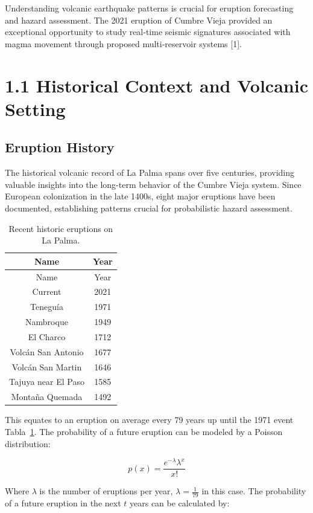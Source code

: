 \documentclass[
  spanish,
  letterpaper,
]{book}
\begin{document}
Understanding volcanic earthquake patterns is crucial for eruption
forecasting and hazard assessment. The 2021 eruption of Cumbre Vieja
provided an exceptional opportunity to study real-time seismic
signatures associated with magma movement through proposed
multi-reservoir systems {[}1{]}.

\section{1.1 Historical Context and Volcanic
Setting}\label{historical-context-and-volcanic-setting}

\subsection{Eruption History}\label{eruption-history}

The historical volcanic record of La Palma spans over five centuries,
providing valuable insights into the long-term behavior of the Cumbre
Vieja system. Since European colonization in the late 1400s, eight major
eruptions have been documented, establishing patterns crucial for
probabilistic hazard assessment.

\begin{longtable}[]{@{}cc@{}}
\caption{Recent historic eruptions on La
Palma.}\label{tbl-Tabla1}\tabularnewline
\toprule\noalign{}
Name & Year \\
\midrule\noalign{}
\endfirsthead
\toprule\noalign{}
Name & Year \\
\midrule\noalign{}
\endhead
\bottomrule\noalign{}
\endlastfoot
Current & 2021 \\
Teneguía & 1971 \\
Nambroque & 1949 \\
El Charco & 1712 \\
Volcán San Antonio & 1677 \\
Volcán San Martin & 1646 \\
Tajuya near El Paso & 1585 \\
Montaña Quemada & 1492 \\
\end{longtable}

This equates to an eruption on average every 79 years up until the 1971
event Tabla~\ref{tbl-Tabla1}. The probability of a future eruption can
be modeled by a Poisson distribution:

\[
p(x)=\frac{e^{-\lambda} \lambda^{x}}{x !}
\]

Where \(\lambda\) is the number of eruptions per year,
\(\lambda=\frac{1}{79}\) in this case. The probability of a future
eruption in the next \(t\) years can be calculated by:
\end{document}
